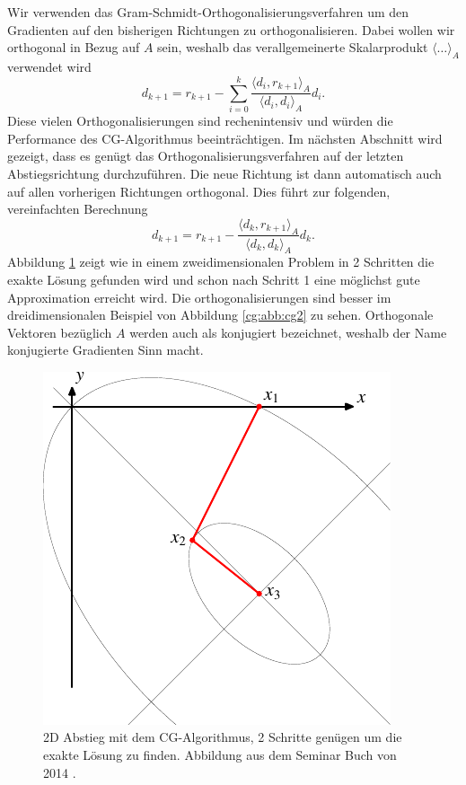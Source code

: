 Wir verwenden das Gram-Schmidt-Orthogonalisierungsverfahren um den Gradienten auf den bisherigen Richtungen zu orthogonalisieren.
Dabei wollen wir orthogonal in Bezug auf $A$ sein, weshalb das verallgemeinerte Skalarprodukt $\langle \dots \rangle_A$ verwendet wird 
\begin{equation}\label{cg:eq:gram}
	d_{k+1} 
	= 
	r_{k+1} - \sum_{i=0}^{k} \frac{\langle d_i , r_{k+1} \rangle_A}{\langle d_i , d_i \rangle_A} d_i.
\end{equation}
Diese vielen Orthogonalisierungen sind rechenintensiv und würden die Performance des CG-Algorithmus beeinträchtigen.
Im nächsten Abschnitt wird gezeigt, dass es genügt das Orthogonalisierungsverfahren auf der letzten Abstiegsrichtung durchzuführen.
Die neue Richtung ist dann automatisch auch auf allen vorherigen Richtungen orthogonal.
Dies führt zur folgenden, vereinfachten Berechnung
\begin{equation} 
	d_{k+1}
	= 
	r_{k+1} - \frac{\langle d_k , r_{k+1} \rangle_A}{\langle d_k , d_k \rangle_A} d_k.
\end{equation}
Abbildung \ref{cg:abb:cg1} zeigt wie in einem zweidimensionalen Problem in 2 Schritten die exakte Lösung gefunden wird und schon nach Schritt 1 eine möglichst gute Approximation erreicht wird.
Die orthogonalisierungen sind besser im dreidimensionalen Beispiel von Abbildung \ref{cg:abb:cg2} zu sehen.
Orthogonale Vektoren bezüglich $A$ werden auch als konjugiert bezeichnet, weshalb der Name konjugierte Gradienten Sinn macht.
\begin{figure}	
	\centering
	\includegraphics{papers/cg/images/descent-3}
	\caption{2D Abstieg mit dem CG-Algorithmus, 2 Schritte genügen um die exakte Lösung zu finden. 
		Abbildung aus dem Seminar Buch von 2014 \cite{cg:book:hpc}.}
	\label{cg:abb:cg1}
\end{figure}

